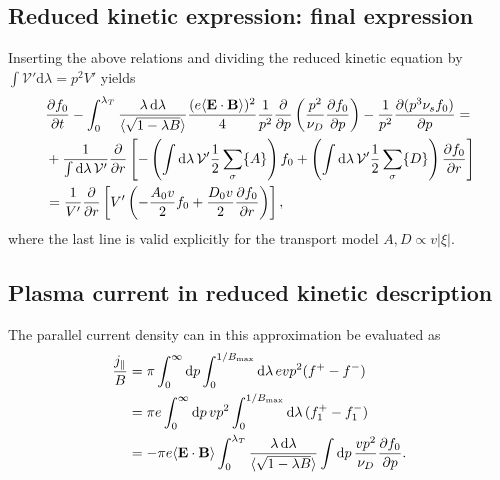 \documentclass[11pt,a4paper]{article}
\newcommand{\rd}{\ensuremath{\mathrm{d}}}
\newcommand{\sub}[1]{\ensuremath{_{\text{#1}}}}
\renewcommand{\b}[1]{\ensuremath{ {\bf #1 } }}
\begin{document}
\subsection{Reduced kinetic expression: final expression}
Inserting the above relations and dividing the reduced kinetic equation by $\int \mathcal{V}'\rd\lambda = p^2 V'$ yields
\begin{align}
&\frac{\partial f_0}{\partial t} - \int_0^{\lambda_T}\frac{\lambda\,\rd \lambda}{\langle\sqrt{1-\lambda B}\rangle} \frac{(e\langle \b{E}\cdot\b{B}\rangle)^2}{4} \frac{1}{p^2}\frac{\partial}{\partial p} \left(\frac{p^2}{\nu_D}\frac{\partial f_0}{\partial p}\right) - \frac{1}{p^2}\frac{\partial(p^3 \nu_s f_0)}{\partial p} =  \nonumber \\
&+\frac{1}{\int \rd \lambda \, \mathcal{V}' }\frac{\partial}{\partial r}\left[- \left(\int \rd \lambda \, \mathcal{V}' \frac{1}{2}\sum_\sigma\{A\}\right)f_0+  \left(\int \rd \lambda \, \mathcal{V}' \frac{1}{2}\sum_\sigma\{D\}\right)\frac{\partial f_0}{\partial r}\right] \nonumber \\
&=\frac{1}{V'}\frac{\partial}{\partial r}\left[V' \left( -\frac{A_0 v}{2} f_0+  \frac{D_0 v}{2}\frac{\partial f_0}{\partial r}\right)\right] ,
\end{align}
where the last line is valid explicitly for the transport model $A,D \propto v|\xi|$.

\subsection{Plasma current in reduced kinetic description}
The parallel current density can in this approximation be evaluated as
\begin{align}
\frac{j_\parallel}{B} &= \pi\int_0^\infty \rd p \int_0^{1/B\sub{max}}\rd\lambda\, evp^2(f^+-f^-) \nonumber \\
&=\pi e\int_0^\infty \rd p\,vp^2 \int_0^{1/B\sub{max}}\rd\lambda\, (f_1^+-f_1^-) \nonumber \\
&= -\pi  e\langle \b{E}\cdot\b{B}\rangle \int_0^{\lambda_T}\frac{\lambda\,\rd \lambda}{\langle\sqrt{1-\lambda B}\rangle}\int \rd p \, \frac{vp^2}{\nu_D}\frac{\partial f_0}{\partial p}.
\end{align}
\end{document}
